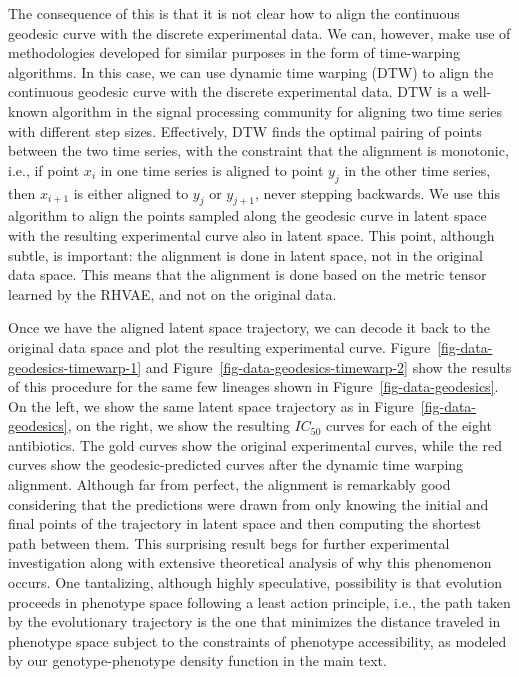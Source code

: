 \documentclass[
]{scrartcl}
\begin{document}
\begin{refsection}
The consequence of this is that it is not clear how to align the
continuous geodesic curve with the discrete experimental data. We can,
however, make use of methodologies developed for similar purposes in the
form of time-warping algorithms. In this case, we can use dynamic time
warping (DTW) to align the continuous geodesic curve with the discrete
experimental data. DTW is a well-known algorithm in the signal
processing community for aligning two time series with different step
sizes. Effectively, DTW finds the optimal pairing of points between the
two time series, with the constraint that the alignment is monotonic,
i.e., if point \(x_i\) in one time series is aligned to point \(y_j\) in
the other time series, then \(x_{i+1}\) is either aligned to \(y_{j}\)
or \(y_{j+1}\), never stepping backwards. We use this algorithm to align
the points sampled along the geodesic curve in latent space with the
resulting experimental curve also in latent space. This point, although
subtle, is important: the alignment is done in latent space, not in the
original data space. This means that the alignment is done based on the
metric tensor learned by the RHVAE, and not on the original data.

Once we have the aligned latent space trajectory, we can decode it back
to the original data space and plot the resulting experimental curve.
Figure~\ref{fig-data-geodesics-timewarp-1} and
Figure~\ref{fig-data-geodesics-timewarp-2} show the results of this
procedure for the same few lineages shown in
Figure~\ref{fig-data-geodesics}. On the left, we show the same latent
space trajectory as in Figure~\ref{fig-data-geodesics}, on the right, we
show the resulting \(IC_{50}\) curves for each of the eight antibiotics.
The gold curves show the original experimental curves, while the red
curves show the geodesic-predicted curves after the dynamic time warping
alignment. Although far from perfect, the alignment is remarkably good
considering that the predictions were drawn from only knowing the
initial and final points of the trajectory in latent space and then
computing the shortest path between them. This surprising result begs
for further experimental investigation along with extensive theoretical
analysis of why this phenomenon occurs. One tantalizing, although highly
speculative, possibility is that evolution proceeds in phenotype space
following a least action principle, i.e., the path taken by the
evolutionary trajectory is the one that minimizes the distance traveled
in phenotype space subject to the constraints of phenotype
accessibility, as modeled by our genotype-phenotype density function in
the main text.


\end{refsection}
\end{document}
